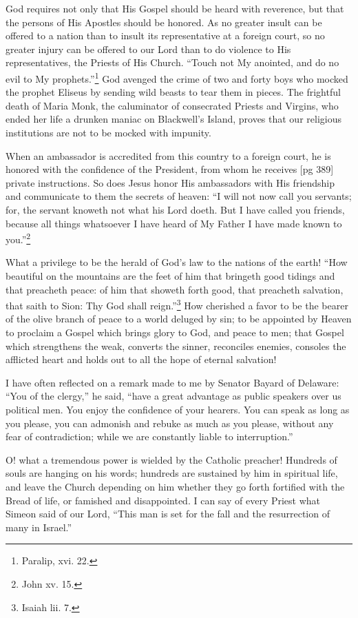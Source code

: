 God requires not only that His Gospel should
be heard with reverence, but that the persons of
His Apostles should be honored. As no greater
insult can be offered to a nation than to insult its
representative at a foreign court, so no greater
injury can be offered to our Lord than to do violence
to His representatives, the Priests of His
Church. “Touch not My anointed, and do no evil
to My prophets.”\footnote{Paralip, xvi.
22.} God avenged the crime of two
and forty boys who mocked the prophet Eliseus
by sending wild beasts to tear them in pieces.
The frightful death of Maria Monk, the caluminator
of consecrated Priests and Virgins, who ended
her life a drunken maniac on Blackwell's Island,
proves that our religious institutions are not to be
mocked with impunity.

When an ambassador is accredited from this
country to a foreign court, he is honored with the
confidence of the President, from whom he receives
[pg 389]
private instructions. So does Jesus honor His
ambassadors with His friendship and communicate
to them the secrets of heaven: “I will not
now call you servants; for, the servant knoweth
not what his Lord doeth. But I have called you
friends, because all things whatsoever I have
heard of My Father I have made known to you.”\footnote{John xv. 15.}

What a privilege to be the herald of God's law
to the nations of the earth! “How beautiful on the
mountains are the feet of him that bringeth good
tidings and that preacheth peace: of him that
showeth forth good, that preacheth salvation, that
saith to Sion: Thy God shall reign.”\footnote{Isaiah
lii. 7.} How cherished
a favor to be the bearer of the olive branch
of peace to a world deluged by sin; to be appointed
by Heaven to proclaim a Gospel which brings
glory to God, and peace to men; that Gospel which
strengthens the weak, converts the sinner, reconciles
enemies, consoles the afflicted heart and holds
out to all the hope of eternal salvation!

I have often reflected on a remark made to me by
Senator Bayard of Delaware: “You of the clergy,”
he said, “have a great advantage as public speakers
over us political men. You enjoy the confidence
of your hearers. You can speak as long as
you please, you can admonish and rebuke as much
as you please, without any fear of contradiction;
while we are constantly liable to interruption.”

O! what a tremendous power is wielded by the
Catholic preacher! Hundreds of souls are hanging
on his words; hundreds are sustained by him in
spiritual life, and leave the Church depending on
him whether they go forth fortified with the Bread
of life, or famished and disappointed. I can say of
every Priest what Simeon said of our Lord, “This
man is set for the fall and the resurrection of many
in Israel.”

